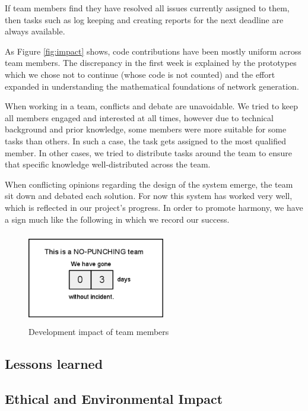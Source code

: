 \documentclass[a4paper,11pt,titlepage]{article}
\begin{document}
If team members find they have resolved all issues currently assigned to them, then tasks such as log keeping and creating reports for the next deadline are always available.

As Figure \ref{fig:impact} shows, code contributions have been mostly uniform across team members. The discrepancy in the first week is explained by the prototypes which we chose not to continue (whose code is not counted) and the effort expanded in understanding the mathematical foundations of network generation.

When working in a team, conflicts and debate are unavoidable. We tried to keep all members engaged and interested at all times, however due to technical background and prior knowledge, some members were more suitable for some tasks than others. In such a case, the task gets assigned to the most qualified member. In other cases, we tried to distribute tasks around the team to ensure that specific knowledge well-distributed across the team.

When conflicting opinions regarding the design of the system emerge, the team sit down and debated each solution. For now this system has worked very well, which is reflected in our project’s progress. In order to promote harmony, we have a sign much like the following in which we record our success.

\begin{figure}[h]
  \centering
  \includegraphics[height=40mm,width=60mm]{no-punching.png}
  \caption{Development impact of team members}
  \label{fig:punch}
\end{figure}

\subsection{Lessons learned}


\subsection{Ethical and Environmental Impact}
\end{document}
